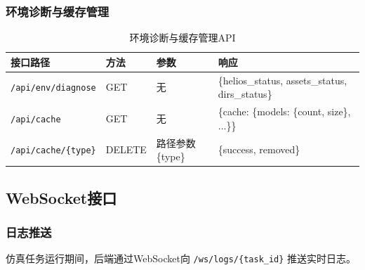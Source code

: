 \documentclass[a4paper,fleqn]{cas-sc}
\begin{document}
\subsubsection{环境诊断与缓存管理}

\begin{table}[pos=!htbp]
    \centering
    \caption{环境诊断与缓存管理API}
    \label{tab:api-env-cache}
    \begin{tabular}{@{} llll @{}}
        \toprule
        \textbf{接口路径}                & \textbf{方法} & \textbf{参数}  & \textbf{响应}                                      \\
        \midrule
        \texttt{/api/env/diagnose}   & GET         & 无            & \{helios\_status, assets\_status, dirs\_status\} \\
        \texttt{/api/cache}          & GET         & 无            & \{cache: \{models: \{count, size\}, ...\}\}      \\
        \texttt{/api/cache/\{type\}} & DELETE      & 路径参数\{type\} & \{success, removed\}                             \\
        \bottomrule
    \end{tabular}
\end{table}

\subsection{WebSocket接口}

\subsubsection{日志推送}
仿真任务运行期间，后端通过WebSocket向 \texttt{/ws/logs/\{task\_id\}} 推送实时日志。
\end{document}

